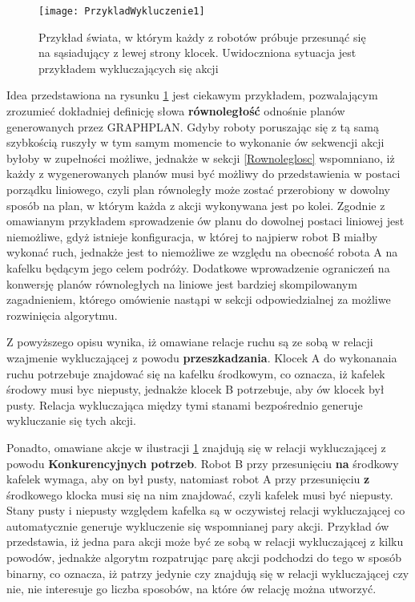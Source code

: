     \begin{figure}[H]
        \texttt{[image: PrzykladWykluczenie1]}
        \centering
        \caption{Przykład świata, w którym każdy z robotów próbuje przesunąć się na sąsiadujący z lewej strony klocek. Uwidoczniona sytuacja 
        jest przykładem wykluczających się akcji}
        \label{PrzykladWykluczenie1}
    \end{figure}

    Idea przedstawiona na rysunku \ref{PrzykladWykluczenie1} jest ciekawym przykładem, pozwalającym zrozumieć dokładniej definicję słowa 
    \textbf{równoległość} odnośnie planów generowanych przez GRAPHPLAN. Gdyby roboty poruszając się z tą samą szybkością ruszyły w tym samym momencie
    to wykonanie ów sekwencji akcji byłoby w zupełności możliwe, jednakże w sekcji \ref{Rownoleglosc} wspomniano, iż każdy z wygenerowanych planów 
    musi być możliwy do przedstawienia w postaci porządku liniowego, czyli plan równoległy może zostać przerobiony w dowolny sposób na plan,
    w którym każda z akcji wykonywana jest po kolei. Zgodnie z omawianym przykładem sprowadzenie ów planu do dowolnej postaci liniowej jest 
    niemożliwe, gdyż istnieje konfiguracja, w której to najpierw robot B miałby wykonać ruch, jednakże jest to niemożliwe ze względu na 
    obecność robota A na kafelku będącym jego celem podróży. Dodatkowe wprowadzenie ograniczeń na konwersję planów równoległych na liniowe 
    jest bardziej skompilowanym zagadnieniem, którego omówienie nastąpi w sekcji odpowiedzialnej za możliwe rozwinięcia algorytmu.
    
    Z powyższego opisu wynika, iż 
    omawiane relacje ruchu są ze sobą w relacji wzajmenie wykluczającej z powodu \textbf{przeszkadzania}. 
    Klocek A do wykonanaia ruchu potrzebuje znajdować się na kafelku środkowym, co oznacza, iż kafelek środowy musi byc niepusty, 
    jednakże klocek B potrzebuje, aby ów klocek był pusty. Relacja wykluczająca między tymi stanami bezpośrednio generuje wykluczanie się tych akcji.
    
    Ponadto, omawiane akcje w ilustracji \ref{PrzykladWykluczenie1} znajdują się w relacji wykluczającej z powodu \textbf{Konkurencyjnych potrzeb}. 
    Robot B przy przesunięciu \textbf{na} środkowy kafelek wymaga, aby on był pusty, natomiast robot A przy przesunięciu \textbf{z} środkowego klocka 
    musi się na nim znajdować, czyli kafelek musi być niepusty. Stany pusty i niepusty względem kafelka są w oczywistej relacji wykluczającej 
    co automatycznie generuje wykluczenie się wspomnianej pary akcji. Przykład ów przedstawia, iż jedna para akcji może być ze sobą w relacji wykluczającej 
    z kilku powodów, jednakże algorytm rozpatrując parę akcji podchodzi do tego w sposób binarny, co oznacza, iż patrzy jedynie czy znajdują się w 
    relacji wykluczającej czy nie, nie interesuje go liczba sposobów, na które ów relację można utworzyć.    

